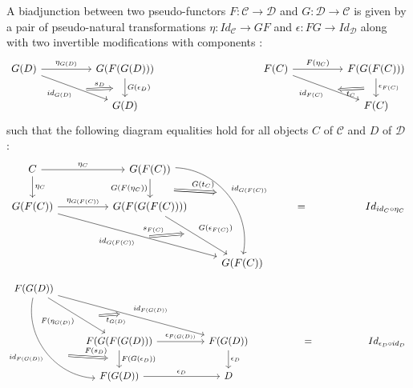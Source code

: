 \documentclass[10pt]{llncs}
\begin{document}
\begin{definition}
A biadjunction between two pseudo-functors $F:\mathcal{C} \rightarrow \mathcal{D}$ and $G:\mathcal{D} \rightarrow \mathcal{C}$ is given by a pair of pseudo-natural transformations $\eta: Id_{\mathcal{C}} \rightarrow G F$ and $\epsilon : F G \rightarrow Id_{\mathcal{D}}$ along with two invertible modifications with components :
$$
\begin{tikzcd}
G(D)
\arrow{rr}{\eta_{G(D)}}
\arrow[swap]{rrd}{id_{G(D)}}[name=A]{}
&&
G(F(G(D)))
\arrow{d}{G(\epsilon_D)}[name=B]{}
&&&&
F(C)
\arrow{rr}{F(\eta_C)}
\arrow[swap]{rrd}{id_{F(C)}}[name=C]{}
&&
F(G(F(C)))
\arrow{d}{\epsilon_{F(C)}}[name=D]{}
\\
&&
G(D)
&&&&&&
F(C)
\arrow[Rightarrow,shorten >=0.4cm, shorten <=0.4cm,from=A,to=B]{}{s_D}
\arrow[Rightarrow,shorten >=0.4cm, shorten <=0.4cm,from=D,to=C]{}{t_C}
\end{tikzcd}
$$
such that the following diagram equalities hold for all objects $C$ of $\mathcal{C}$ and $D$ of $\mathcal{D}$ :
$$
\begin{tikzcd}
C
\arrow{rr}{\eta_C}
\arrow{d}{\eta_C}
&&
G(F(C))
\arrow[swap]{d}{G(F(\eta_C))}[name=B]{}
\arrow[bend left=50]{rddd}{id_{G(F(C))}}[name=C]{}
\\
G(F(C))
\arrow{rr}{\eta_{G(F(C))}}
\arrow[swap]{rrrdd}{id_{G(F(C))}}[name=A]{}
&&
G(F(G(F(C))))
\arrow{rdd}{G(\epsilon_{F(C)})}[name=D]{}
&&
=
&&
 Id_{id_C \circ \eta_C}
\\
\\
&&
&
G(F(C))
\arrow[Rightarrow,shorten >=0.4cm, shorten <=0.4cm,from=A,to=D]{}{s_{F(C)}}
\arrow[Rightarrow,shorten >=0.4cm, shorten <=0.8cm,from=B,to=C]{}{G(t_C)}
\end{tikzcd}
$$
$$
\begin{tikzcd}
F(G(D))
\arrow[swap,bend right=50]{dddr}{id_{F(G(D))}}[name=A]{}
\arrow[swap]{ddr}{F(\eta_{G(D)})}[name=B]{}
\arrow{ddrrr}{id_{F(G(D))}}[name=C]{}
\\
\\
&
F(G(F(G(D)))
\arrow{rr}{\epsilon_{F(G(D))}}
\arrow{d}{F(G(\epsilon_D))}[name=D]{}
&&
F(G(D))
\arrow{d}{\epsilon_D}
&&
=
&&
Id_{\epsilon_D \circ id_D}
\\
&
F(G(D))
\arrow{rr}{\epsilon_D}
&&
D
\arrow[Rightarrow,shorten >=0.4cm, shorten <=0.8cm,from=A,to=D]{}{F(s_{D})}
\arrow[swap,Rightarrow,shorten >=0.4cm, shorten <=0.8cm,from=B,to=C]{}{t_{G(D)}}
\end{tikzcd}
$$
\end{definition}
\end{document}

